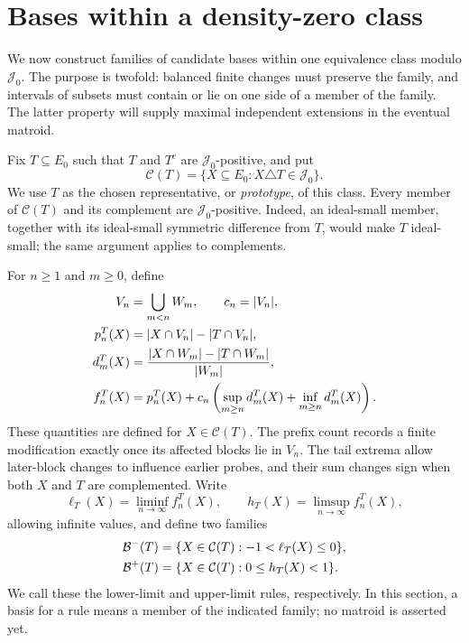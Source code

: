 \section{Bases within a density-zero class}\label{sec:local-bases}

We now construct families of candidate bases within one equivalence class
modulo $\mathcal J_0$. The purpose is twofold: balanced finite changes
must preserve the family, and intervals of subsets must contain or lie
on one side of a member of the family. The latter property will supply
maximal independent extensions in the eventual matroid.

Fix $T\subseteq E_0$ such that $T$ and $T^c$ are
$\mathcal J_0$-positive, and put
\[
 \mathcal C(T)=\{X\subseteq E_0:X\triangle T\in\mathcal J_0\}.
\]
We use $T$ as the chosen representative, or \emph{prototype}, of this class.
Every member of $\mathcal C(T)$ and its complement are
$\mathcal J_0$-positive. Indeed, an ideal-small member, together with its
ideal-small symmetric difference from $T$, would make $T$ ideal-small;
the same argument applies to complements.

For $n\ge1$ and $m\ge0$, define
\begin{align}
 V_n&=\bigcup_{m<n}W_m,\qquad c_n=|V_n|,\notag\\
 p_n^T(X)&=|X\cap V_n|-|T\cap V_n|,\notag\\
 d_m^T(X)&=\frac{|X\cap W_m|-|T\cap W_m|}{|W_m|},\notag\\
 f_n^T(X)&=p_n^T(X)+c_n\left(
       \sup_{m\ge n}d_m^T(X)+\inf_{m\ge n}d_m^T(X)\right).
       \label{eq:probes}
\end{align}
These quantities are defined for $X\in\mathcal C(T)$. The prefix count
records a finite modification exactly once its affected blocks lie in
$V_n$. The tail extrema allow later-block changes to influence earlier
probes, and their sum changes sign when both $X$ and $T$ are complemented.
Write
\[
 \ell_T(X)=\liminf_{n\to\infty}f_n^T(X),\qquad
 h_T(X)=\limsup_{n\to\infty}f_n^T(X),
\]
allowing infinite values, and define two families
\begin{align}
 \mathcal B^-(T)&=\{X\in\mathcal C(T):-1<\ell_T(X)\le0\},\notag\\
 \mathcal B^+(T)&=\{X\in\mathcal C(T):0\le h_T(X)<1\}.
 \label{eq:local-bases}
\end{align}
We call these the lower-limit and upper-limit rules, respectively.
In this section, a basis for a rule means a member of the indicated
family; no matroid is asserted yet.

